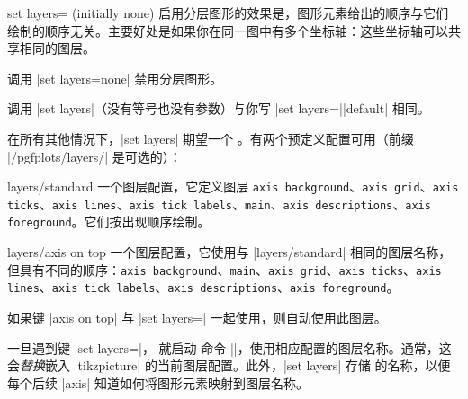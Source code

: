 {\begin{pgfplotskey}{set layers= (initially none)}
   启用分层图形的效果是，图形元素给出的顺序与它们绘制的顺序无关。主要好处是如果你在同一图中有多个坐标轴：这些坐标轴可以共享相同的图层。

   调用 |set layers=none| 禁用分层图形。

   调用 |set layers|（没有等号也没有参数）与你写 |set layers=||default| 相同。

   在所有其他情况下，|set layers| 期望一个 。有两个预定义配置可用（前缀 |/pgfplots/layers/| 是可选的）：

   \begin{pgfplotskey}{layers/standard}
       一个图层配置，它定义图层 \texttt{axis background}、\texttt{axis grid}、\texttt{axis ticks}、\texttt{axis lines}、\texttt{axis tick labels}、\texttt{main}、\texttt{axis descriptions}、\texttt{axis foreground}。它们按出现顺序绘制。
   \end{pgfplotskey}

   \begin{pgfplotskey}{layers/axis on top}
       一个图层配置，它使用与 |layers/standard| 相同的图层名称，但具有不同的顺序：\texttt{axis background}、\texttt{main}、\texttt{axis grid}、\texttt{axis ticks}、\texttt{axis lines}、\texttt{axis tick labels}、\texttt{axis descriptions}、\texttt{axis foreground}。

        如果键 |axis on top| 与 |set layers=| 一起使用，则自动使用此图层。
   \end{pgfplotskey}

    一旦遇到键 |set layers=|，\PGFPlots{} 就启动 \pgfname{} 命令 |\pgfsetlayers|，使用相应配置的图层名称。通常，这会\emph{替换}嵌入 |tikzpicture| 的当前图层配置。此外，|set layers| 存储  的名称，以便每个后续 |axis| 知道如何将图形元素映射到图层名称。


\end{pgfplotskey}}
